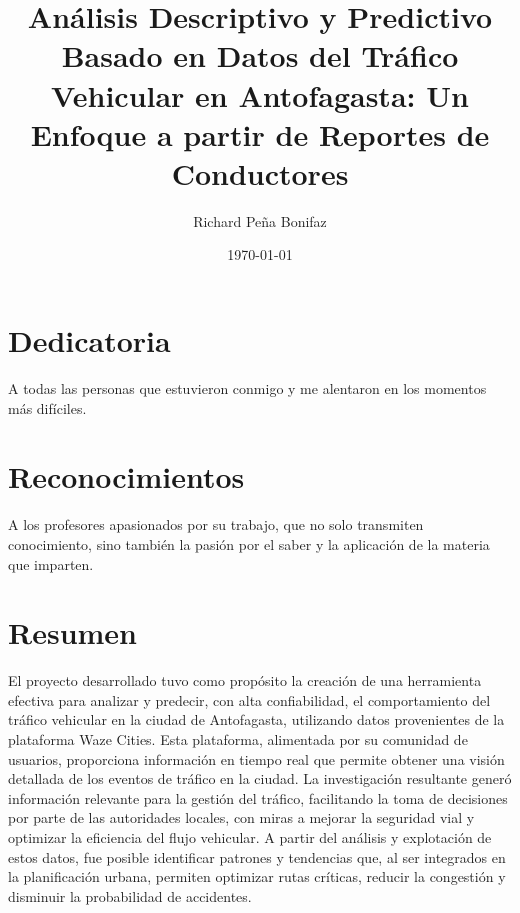 \documentclass[12pt]{article}
\begin{document}
\title{Análisis Descriptivo y Predictivo Basado en Datos del Tráfico Vehicular en Antofagasta: Un Enfoque a partir de Reportes de Conductores}
\author{Richard Peña Bonifaz}
\date{\today}
\maketitle

\section*{Dedicatoria}

A todas las personas que estuvieron conmigo y me alentaron en los momentos más difíciles.

\section*{Reconocimientos}

A los profesores apasionados por su trabajo, que no solo transmiten conocimiento, sino también la pasión por el saber y la aplicación de la materia que imparten.

\newpage
\tableofcontents
\listoffigures
\listoftables
\newpage

\section*{Resumen}

El proyecto desarrollado tuvo como propósito la creación de una herramienta efectiva para analizar y predecir, con alta confiabilidad, el comportamiento del tráfico vehicular en la ciudad de Antofagasta, utilizando datos provenientes de la plataforma Waze Cities. Esta plataforma, alimentada por su comunidad de usuarios, proporciona información en tiempo real que permite obtener una visión detallada de los eventos de tráfico en la ciudad. La investigación resultante generó información relevante para la gestión del tráfico, facilitando la toma de decisiones por parte de las autoridades locales, con miras a mejorar la seguridad vial y optimizar la eficiencia del flujo vehicular. A partir del análisis y explotación de estos datos, fue posible identificar patrones y tendencias que, al ser integrados en la planificación urbana, permiten optimizar rutas críticas, reducir la congestión y disminuir la probabilidad de accidentes.
\end{document}
